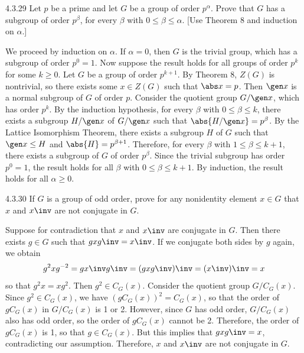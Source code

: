 \begin{exercise}{4.3.29}
	Let $p$ be a prime and let $G$ be a group of order $p^\alpha$.
	Prove that $G$ has a subgroup of order $p^\beta$, for every $\beta$ with $0 \leq \beta \leq \alpha$. [Use Theorem 8 and induction on $\alpha$.]
\end{exercise}

\begin{sol}
	We proceed by induction on $\alpha$.
	If $\alpha = 0$, then $G$ is the trivial group, which has a subgroup of order $p^0 = 1$.
	Now suppose the result holds for all groups of order $p^k$ for some $k \geq 0$.
	Let $G$ be a group of order $p^{k + 1}$.
	By Theorem 8, $Z(G)$ is nontrivial, so there exists some $x \in Z(G)$ such that $\abs x = p$.
	Then $\gen x$ is a normal subgroup of $G$ of order $p$.
	Consider the quotient group $G/\gen x$, which has order $p^k$.
	By the induction hypothesis, for every $\beta$ with $0 \leq \beta \leq k$, there exists a subgroup $H/\gen x$ of $G/\gen x$ such that $\abs{H/\gen x} = p^\beta$.
	By the Lattice Isomorphism Theorem, there exists a subgroup $H$ of $G$ such that $\gen x \leq H$ and $\abs{H} = p^{\beta + 1}$.
	Therefore, for every $\beta$ with $1 \leq \beta \leq k + 1$, there exists a subgroup of $G$ of order $p^\beta$.
	Since the trivial subgroup has order $p^0 = 1$, the result holds for all $\beta$ with $0 \leq \beta \leq k + 1$.
	By induction, the result holds for all $\alpha \geq 0$.
\end{sol}

\begin{exercise}{4.3.30}
	If $G$ is a group of odd order, prove for any nonidentity element $x \in G$ that $x$ and $x\inv$ are not conjugate in $G$.
\end{exercise}

\begin{sol}
	Suppose for contradiction that $x$ and $x\inv$ are conjugate in $G$.
	Then there exists $g \in G$ such that $gxg\inv = x\inv$.
	If we conjugate both sides by $g$ again, we obtain
	\[
		g^2xg^{-2} = gx\inv g\inv = (gxg\inv)\inv = (x\inv)\inv = x
	\]
	so that $g^2x = xg^2$.
	Then $g^2 \in C_G(x)$.
	Consider the quotient group $G/C_G(x)$.
	Since $g^2 \in C_G(x)$, we have $(gC_G(x))^2 = C_G(x)$, so that the order of $gC_G(x)$ in $G/C_G(x)$ is 1 or 2.
	However, since $G$ has odd order, $G/C_G(x)$ also has odd order, so the order of $gC_G(x)$ cannot be 2.
	Therefore, the order of $gC_G(x)$ is 1, so that $g \in C_G(x)$.
	But this implies that $gxg\inv = x$, contradicting our assumption.
	Therefore, $x$ and $x\inv$ are not conjugate in $G$.
\end{sol}

